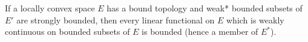 If a locally convex space $E$ has a bound topology and weak* bounded subsets of $E'$ are strongly bounded, then every linear functional on $E$ which is weakly continuous on bounded subsets of $E$ is bounded (hence a member of $E^*$).
